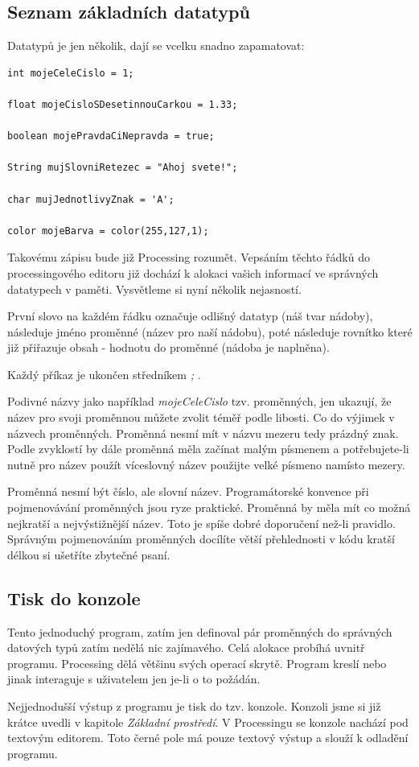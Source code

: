 \documentclass[10pt,twopage]{book}
\newcommand{\pododdil}[1]{\subsection{#1}\label{subsec:#1}}
\begin{document}
\pododdil{Seznam základních datatypů}
Datatypů je jen několik, dají se vcelku snadno zapamatovat:

\begin{lstlisting}
int mojeCeleCislo = 1;

float mojeCisloSDesetinnouCarkou = 1.33;

boolean mojePravdaCiNepravda = true;

String mujSlovniRetezec = "Ahoj svete!";

char mujJednotlivyZnak = 'A';

color mojeBarva = color(255,127,1);
\end{lstlisting}

Takovému zápisu bude již Processing rozumět. Vepsáním těchto řádků do processingového editoru již dochází k alokaci vašich informací ve správných datatypech v paměti. Vysvětleme si nyní několik nejasností.

První slovo na každém řádku označuje odlišný datatyp (náš tvar nádoby), následuje jméno proměnné (název pro naší nádobu), poté následuje rovnítko které již přiřazuje obsah - hodnotu do proměnné (nádoba je naplněna).

Každý příkaz je ukončen středníkem {\em ;} .

Podivné názvy jako například {\em mojeCeleCislo} tzv. proměnných, jen ukazují, že název pro svoji proměnnou můžete zvolit téměř podle libosti. Co do výjimek v názvech proměnných. Proměnná nesmí mít v názvu mezeru tedy prázdný znak. Podle zvyklostí by dále proměnná měla začínat malým písmenem a potřebujete-li nutně pro název použít víceslovný název použijte velké písmeno namísto mezery.

Proměnná nesmí být číslo, ale slovní název. Programátorské konvence při pojmenovávání proměnných jsou ryze praktické. Proměnná by měla mít co možná nejkratší a nejvýstižnější název.  Toto je spíše dobré doporučení než-li pravidlo. Správným pojmenováním proměnných docílíte větší přehlednosti v kódu kratší délkou si ušetříte zbytečné psaní.

\pododdil{Tisk do konzole}

Tento jednoduchý program, zatím jen definoval pár proměnných do správných datových typů zatím nedělá nic zajímavého. Celá alokace probíhá uvnitř programu. Processing dělá většinu svých operací skrytě. Program kreslí nebo jinak interaguje s uživatelem jen je-li o to požádán.

Nejjednodušší výstup z programu je tisk do tzv. konzole. Konzoli jsme si již krátce uvedli v kapitole {\em Základní prostředí}. V Processingu se konzole nachází pod textovým editorem. Toto černé pole má pouze textový výstup a slouží k odladění programu.
\end{document}

